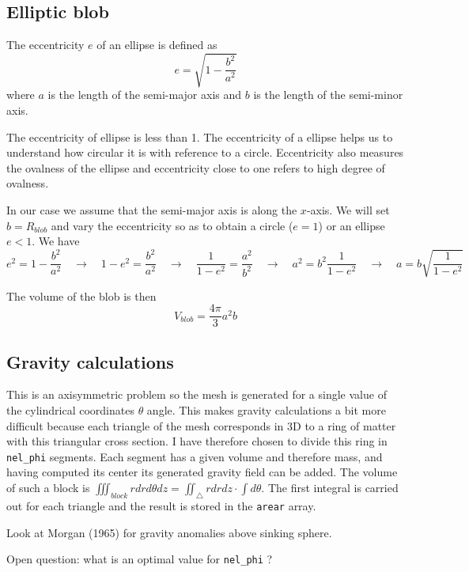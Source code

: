 \subsection*{Elliptic blob}

The eccentricity $e$ of an ellipse is defined as 
\[
e=\sqrt{1-\frac{b^2}{a^2}}
\]
where $a$ is the length of the semi-major axis and $b$ is the length of the semi-minor axis.

The eccentricity of ellipse is less than 1. The eccentricity of a ellipse helps us to understand how circular it is with reference to a circle. Eccentricity also measures the ovalness of the ellipse and eccentricity close to one refers to high degree of ovalness.

In our case we assume that the semi-major axis is along the $x$-axis.
We will set $b=R_{blob}$ and vary the eccentricity so as to obtain a circle ($e=1$) or an ellipse $e<1$.
We have
\[
e^2 = 1 -\frac{b^2}{a^2}
\quad
\rightarrow
\quad
1-e^2 = \frac{b^2}{a^2}
\quad
\rightarrow
\quad
\frac{1}{1-e^2} = \frac{a^2}{b^2}
\quad
\rightarrow
\quad
a^2 = b^2 \frac{1}{1-e^2} 
\quad
\rightarrow
\quad
a = b \sqrt{\frac{1}{1-e^2}}
\]

The volume of the blob is then 
\[
V_{blob} = \frac{4\pi}{3}a^2b
\]


 
\subsection*{Gravity calculations}

This is an axisymmetric problem so the mesh is generated for a single 
value of the cylindrical coordinates $\theta$ angle. 
This makes gravity calculations a bit more difficult because each triangle 
of the mesh corresponds in 3D to a ring of matter with this triangular cross section. 
I have therefore chosen to divide this ring in {\tt nel\_phi} segments. 
Each segment has a given volume and therefore mass, 
and having computed its center its generated gravity field can be added. 
The volume of such a block is 
$\iiint_{block} r dr d\theta dz =\iint_\triangle rdrdz \cdot \int d\theta$.  
The first integral is carried out for each triangle and the result is stored 
in the {\tt arear} array. 


Look at Morgan (1965) \cite{morg65} for gravity anomalies above sinking sphere. 

Open question: what is an optimal value for {\tt nel\_phi} ?








